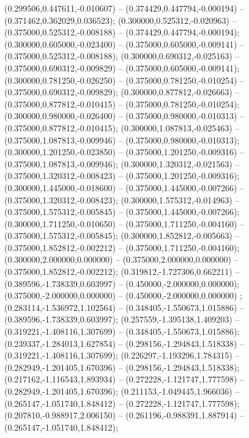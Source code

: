  (0.299506,0.447611,-0.010607) -- (0.374429,0.447794,-0.000194) -- (0.371462,0.362029,0.036523);
 (0.300000,0.525312,-0.020963) -- (0.375000,0.525312,-0.008188) -- (0.374429,0.447794,-0.000194);
 (0.300000,0.605000,-0.023400) -- (0.375000,0.605000,-0.009141) -- (0.375000,0.525312,-0.008188);
 (0.300000,0.690312,-0.025163) -- (0.375000,0.690312,-0.009829) -- (0.375000,0.605000,-0.009141);
 (0.300000,0.781250,-0.026250) -- (0.375000,0.781250,-0.010254) -- (0.375000,0.690312,-0.009829);
 (0.300000,0.877812,-0.026663) -- (0.375000,0.877812,-0.010415) -- (0.375000,0.781250,-0.010254);
 (0.300000,0.980000,-0.026400) -- (0.375000,0.980000,-0.010313) -- (0.375000,0.877812,-0.010415);
 (0.300000,1.087813,-0.025463) -- (0.375000,1.087813,-0.009946) -- (0.375000,0.980000,-0.010313);
 (0.300000,1.201250,-0.023850) -- (0.375000,1.201250,-0.009316) -- (0.375000,1.087813,-0.009946);
 (0.300000,1.320312,-0.021563) -- (0.375000,1.320312,-0.008423) -- (0.375000,1.201250,-0.009316);
 (0.300000,1.445000,-0.018600) -- (0.375000,1.445000,-0.007266) -- (0.375000,1.320312,-0.008423);
 (0.300000,1.575312,-0.014963) -- (0.375000,1.575312,-0.005845) -- (0.375000,1.445000,-0.007266);
 (0.300000,1.711250,-0.010650) -- (0.375000,1.711250,-0.004160) -- (0.375000,1.575312,-0.005845);
 (0.300000,1.852812,-0.005663) -- (0.375000,1.852812,-0.002212) -- (0.375000,1.711250,-0.004160);
 (0.300000,2.000000,0.000000) -- (0.375000,2.000000,0.000000) -- (0.375000,1.852812,-0.002212);
 (0.319812,-1.727306,0.662211) -- (0.389596,-1.738339,0.603997) -- (0.450000,-2.000000,0.000000);
 (0.375000,-2.000000,0.000000) -- (0.450000,-2.000000,0.000000) ;
 (0.283114,-1.536972,1.102564) -- (0.348405,-1.550673,1.015886) -- (0.389596,-1.738339,0.603997);
 (0.257559,-1.395138,1.409203) -- (0.319221,-1.408116,1.307699) -- (0.348405,-1.550673,1.015886);
 (0.239337,-1.284013,1.627854) -- (0.298156,-1.294843,1.518338) -- (0.319221,-1.408116,1.307699);
 (0.226297,-1.193296,1.784315) -- (0.282949,-1.201405,1.670396) -- (0.298156,-1.294843,1.518338);
 (0.217162,-1.116543,1.893934) -- (0.272228,-1.121747,1.777598) -- (0.282949,-1.201405,1.670396);
 (0.211153,-1.049445,1.966036) -- (0.265147,-1.051740,1.848412) -- (0.272228,-1.121747,1.777598);
 (0.207810,-0.988917,2.006150) -- (0.261196,-0.988391,1.887914) -- (0.265147,-1.051740,1.848412);
